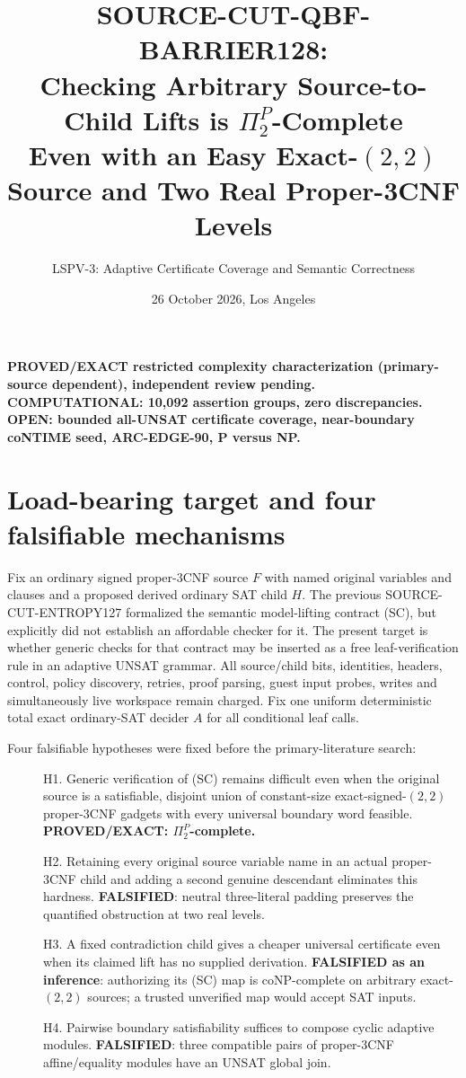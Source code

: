 \documentclass[11pt]{article}
\title{SOURCE-CUT-QBF-BARRIER128:\\Checking Arbitrary Source-to-Child Lifts is $\Pi_2^P$-Complete\\\large Even with an Easy Exact-$(2,2)$ Source and Two Real Proper-3CNF Levels}
\author{LSPV-3: Adaptive Certificate Coverage and Semantic Correctness}
\date{26 October 2026, Los Angeles}
\begin{document}
\maketitle
\begin{center}
\textbf{PROVED/EXACT restricted complexity characterization (primary-source dependent), independent review pending.}\\
\textbf{COMPUTATIONAL: 10,092 assertion groups, zero discrepancies.}\\
\textbf{OPEN: bounded all-UNSAT certificate coverage, near-boundary coNTIME seed, ARC-EDGE-90, P versus NP.}
\end{center}

\section{Load-bearing target and four falsifiable mechanisms}
Fix an ordinary signed proper-3CNF source $F$ with named original variables and clauses and a proposed derived ordinary SAT child $H$. The previous SOURCE-CUT-ENTROPY127 formalized the semantic model-lifting contract (SC), but explicitly did not establish an affordable checker for it. The present target is whether generic checks for that contract may be inserted as a free leaf-verification rule in an adaptive UNSAT grammar. All source/child bits, identities, headers, control, policy discovery, retries, proof parsing, guest input probes, writes and simultaneously live workspace remain charged. Fix one uniform deterministic total exact ordinary-SAT decider $A$ for all conditional leaf calls.

Four falsifiable hypotheses were fixed before the primary-literature search:
\begin{description}
\item[] H1. Generic verification of (SC) remains difficult even when the original source is a satisfiable, disjoint union of constant-size exact-signed-$(2,2)$ proper-3CNF gadgets with every universal boundary word feasible. \textbf{PROVED/EXACT: $\Pi_2^P$-complete.}
\item[] H2. Retaining every original source variable name in an actual proper-3CNF child and adding a second genuine descendant eliminates this hardness. \textbf{FALSIFIED}: neutral three-literal padding preserves the quantified obstruction at two real levels.
\item[] H3. A fixed contradiction child gives a cheaper universal certificate even when its claimed lift has no supplied derivation. \textbf{FALSIFIED as an inference}: authorizing its (SC) map is coNP-complete on arbitrary exact-$(2,2)$ sources; a trusted unverified map would accept SAT inputs.
\item[] H4. Pairwise boundary satisfiability suffices to compose cyclic adaptive modules. \textbf{FALSIFIED}: three compatible pairs of proper-3CNF affine/equality modules have an UNSAT global join.
\end{description}
\end{document}
